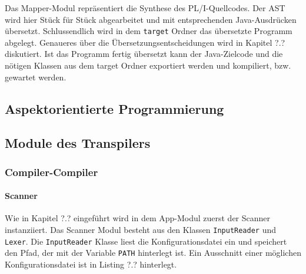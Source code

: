 Das Mapper-Modul repräsentiert die Synthese des PL/I-Quellcodes. Der AST wird hier Stück für Stück abgearbeitet und mit entsprechenden Java-Ausdrücken übersetzt. Schlussendlich wird in dem \verb+target+ Ordner das übersetzte Programm abgelegt. Genaueres über die Übersetzungsentscheidungen wird in Kapitel ?.? diskutiert. 
Ist das Programm fertig übersetzt kann der Java-Zielcode und die nötigen Klassen aus dem target Ordner exportiert werden und kompiliert, bzw. gewartet werden.





\subsection{Aspektorientierte Programmierung}
 
\subsection{Module des Transpilers}
\subsubsection{Compiler-Compiler}
\paragraph{Scanner}

Wie in Kapitel ?.? eingeführt wird in dem App-Modul zuerst der Scanner instanziiert. 
Das Scanner Modul besteht aus den Klassen \verb+InputReader+ und \verb+Lexer+. 
Die \verb+InputReader+ Klasse liest die Konfigurationsdatei ein und speichert den Pfad, der mit der Variable \verb+PATH+
hinterlegt ist. Ein Ausschnitt einer möglichen Konfigurationsdatei ist in Listing ?.? hinterlegt.

